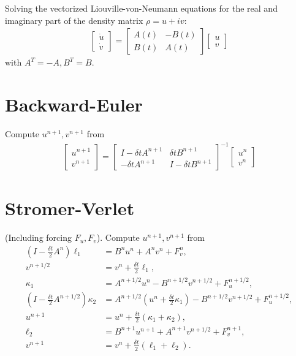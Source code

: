 \documentclass[12pt]{article}
\begin{document}
Solving the vectorized Liouville-von-Neumann equations for the real and imaginary part of the density matrix $\rho = u + iv$:
\begin{align}\label{ODEsystem}
  \begin{bmatrix}
    \dot u \\ \dot v
  \end{bmatrix} = 
  \begin{bmatrix}
      A(t) & -B(t) \\
      B(t) & A(t) 
  \end{bmatrix}
  \begin{bmatrix}
     u \\  v
  \end{bmatrix}
\end{align}
with $A^T=-A, B^T=B$. 

\section{Backward-Euler}

Compute $u^{n+1}, v^{n+1}$ from 
\begin{align}
  \begin{bmatrix}
    u^{n+1} \\ v^{n+1} 
  \end{bmatrix} = 
  \begin{bmatrix}
    I - \delta t A^{n+1} & \delta t B^{n+1} \\ -\delta t A^{n+1} & I-\delta t B^{n+1}
  \end{bmatrix}^{-1}
  \begin{bmatrix}
    u^{n} \\ v^{n} 
  \end{bmatrix}
\end{align}

\section{Stromer-Verlet} 

(Including forcing $F_u, F_v$).
Compute $u^{n+1}, v^{n+1}$ from 
\begin{align}
  \left(I - \frac{\delta t}{2} A^{n}\right) \ell_1 &= B^n u^n + A^n v^n + F_v^n,\\
%
  v^{n+1/2} &= v^n + \frac{\delta t}{2}\ell_1,\\
  \kappa_1 &= A^{n+1/2} u^n - B^{n+1/2} v^{n+1/2} +
  F_u^{n+1/2},\\
%
  \left(I - \frac{\delta t}{2} A^{n+1/2}\right) \kappa_2 &= A^{n+1/2}\left( u^n + \frac{\delta t}{2}
  \kappa_1 \right) - B^{n+1/2}  v^{n+1/2} + F_u^{n+1/2},\\
  u^{n+1} &= u^n + \frac{\delta t}{2}\left( \kappa_1 + \kappa_2 \right),\\
%
  \ell_2 &= B^{n+1} u^{n+1} + A^{n+1}  v^{n+1/2} + F_v^{n+1},\\
  v^{n+1} &= v^n + \frac{\delta t}{2}\left( \ell_1 + \ell_2 \right).
\end{align}
\end{document}
